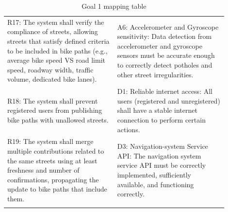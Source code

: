 \documentclass{Configuration_Files/PoliMi3i_thesis}
\begin{document}
\begin{longtable}{|p{0.45\linewidth}|p{0.45\linewidth}|}
    R17: The system shall verify the compliance of streets, allowing streets that satisfy defined criteria to be included in bike paths (e.g., average bike speed VS road limit speed, roadway width, traffic volume, dedicated bike lanes).&A6: Accelerometer and Gyroscope sensitivity: Data detection from accelerometer and gyroscope sensors must be accurate enough to correctly detect potholes and other street irregularities.\\
    R18: The system shall prevent registered users from publishing bike paths with unallowed streets.&D1: Reliable internet access: All users (registered and unregistered) shall have a stable internet connection to perform certain actions.\\
    R19: The system shall merge multiple contributions related to the same streets using at least freshness and number of confirmations, propagating the update to bike paths that include them.&D3: Navigation-system Service API: The navigation system service API must be correctly implemented, sufficiently available, and functioning correctly.\\
    \hline
    \caption{Goal 1 mapping table}
    \end{longtable}
    
\end{document}
